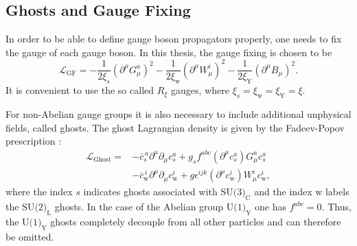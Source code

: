 \documentclass[a4paper,12pt]{book}
\begin{document}
\subsection{Ghosts and Gauge Fixing}
In order to be able to define gauge boson propagators properly, one needs to fix the gauge of each gauge boson. In this thesis, the gauge fixing is chosen to be 
\begin{equation}
\label{eq::Lfix}
\mathcal{L}_\text{GF} = - \frac{1}{2\xi_s}(\partial^\mu G_\mu^a)^2 - \frac{1}{2\xi_\text{w}}(\partial^\mu W_\mu^i)^2 - \frac{1}{2\xi_\text{Y}}(\partial^\mu B_\mu)^2.
\end{equation}
It is convenient to use the so called $R_\xi$ gauges, where $\xi_s=\xi_\text{w}=\xi_\text{Y} =\xi$.\par
For non-Abelian gauge groups it is also necessary to include additional unphysical fields, called ghosts. The ghost Lagrangian density is given by the Fadeev-Popov prescription \cite{ghosts}:
\begin{align}
\nonumber
\mathcal{L}_\text{Ghost} = &-\bar{c}_s^{\,a} \partial^\mu \partial_\mu c_s^a + g_s f^{abc}(\partial^\mu c_s^a) G_\mu^a c_s^a\\
\label{eq::Lghost}
&-\bar{c}_\text{w}^{\,i} \partial^\mu \partial_\mu c_\text{w}^i + g \epsilon^{ijk}(\partial^\mu c_\text{w}^i) W_\mu^i c_\text{w}^i,
\end{align}
where the index $s$ indicates ghosts associated with $\text{SU(3)}_\text{C}$ and the index $\text{w}$ labels the $\text{SU(2)}_\text{L}$ ghosts. In the case of the Abelian group $\text{U(1)}_\text{Y}$ one has $f^{abc} = 0$. Thus, the $\text{U(1)}_\text{Y}$ ghosts completely decouple from all other particles and can therefore be omitted. 
\end{document}
